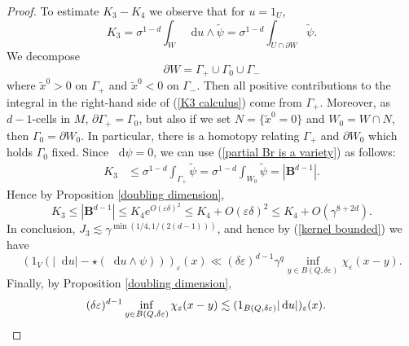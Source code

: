 \documentclass[reqno,10pt]{amsart}
\newcommand{\Ball}{\mathbf{B}}
\newcommand*\dif{\mathop{}\!\mathrm{d}}
\theoremstyle{definition}
\numberwithin{equation}{section}
\begin{document}
\begin{proof}
To estimate $K_3 - K_4$ we observe that for $u = 1_U$,
\begin{equation}\label{K3 calculus}
K_3 = \sigma^{1 - d} \int_W \dif u \wedge \tilde \psi = \sigma^{1 - d} \int_{U \cap \partial W} \tilde \psi.
\end{equation}
We decompose
$$\partial W = \Gamma_+ \cup \Gamma_0 \cup \Gamma_-$$
where $\tilde x^0 > 0$ on $\Gamma_+$ and $\tilde x^0 < 0$ on $\Gamma_-$. Then all positive contributions to the integral in the right-hand side of (\ref{K3 calculus}) come from $\Gamma_+$.
Moreover, as $d-1$-cells in $M$, $\partial \Gamma_+ = \Gamma_0$, but also if we set $N = \{\tilde x^0 = 0\}$ and $W_0 = W \cap N$, then $\Gamma_0 = \partial W_0$.
In particular, there is a homotopy relating $\Gamma_+$ and $\partial W_0$ which holds $\Gamma_0$ fixed.
Since $\dif \psi = 0$, we can use (\ref{partial Br is a variety}) as follows:
\begin{align*}
K_3 &\leq \sigma^{1 - d} \int_{\Gamma_+} \tilde \psi = \sigma^{1 - d} \int_{W_0} \tilde \psi = |\Ball^{d - 1}|.
\end{align*}
Hence by Proposition \ref{doubling dimension},
$$K_3 \leq |\Ball^{d - 1}| \leq K_4 e^{O(\varepsilon\delta)^2} \leq K_4 + O(\varepsilon\delta)^2 \leq K_4 + O(\gamma^{8 + 2d}).$$
In conclusion, $J_3 \lesssim \gamma^{\min(1/4, 1/(2(d - 1)))}$, and hence by (\ref{kernel bounded}) we have
$$(1_V(|\dif u| - \star(\dif u \wedge \psi)))_\varepsilon(x) \ll (\delta\varepsilon)^{d - 1} \gamma^q \inf_{y \in B(Q, \delta\varepsilon)} \chi_\varepsilon(x - y).$$
Finally, by Proposition \ref{doubling dimension},
\begin{align*}
(\delta\varepsilon)^{d - 1} \inf_{y \in B(Q, \delta\varepsilon)} \chi_\varepsilon(x - y) &\lesssim (1_{B(Q, \delta\varepsilon)} |\dif u|)_\varepsilon(x). \qedhere
\end{align*}
\end{proof}
\end{document}
